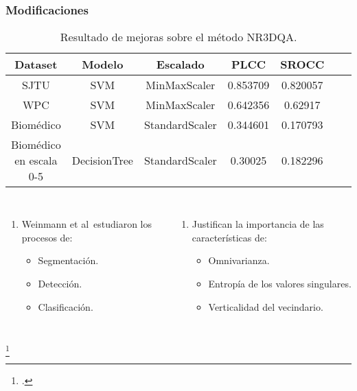 \begin{frame}
  \frametitle{Modificaciones}
  \vspace{-.7cm}
  \begin{table}[htp]
    \small
    \begin{center}
    \caption[Resultado de mejoras sobre el método NR3DQA.]{Resultado de mejoras sobre el método NR3DQA.}
      \begin{tabular}[c]{|c|c|c|c|c|c|c|}
        \hline
        \rowcolor[HTML]{FFC702}
        \textbf{Dataset} & \textbf{Modelo} & \textbf{Escalado} & \textbf{PLCC} & \textbf{SROCC} \\ 
        \hline
        SJTU & SVM & MinMaxScaler & 0.853709 & 0.820057 \\ 
        \hline 
        WPC & SVM & MinMaxScaler & 0.642356 & 0.62917 \\
        \hline 
        Biomédico & SVM & StandardScaler & 0.344601 &  0.170793 \\
        \hline
        Biomédico en escala 0-5 & DecisionTree & StandardScaler & 0.30025  & 0.182296 \\
        \hline
      \end{tabular}
    \end{center}
    \label{tab:ImprovNR3DQA}
  \end{table}
  \begin{columns}
    \begin{enumerate}
      \item Weinmann et al\footnotemark ~estudiaron los procesos de: 
        \begin{itemize}
          \item Segmentación.
          \item Detección.
          \item Clasificación.
        \end{itemize}
    \end{enumerate}
    \begin{enumerate}
      \item Justifican la importancia de las características de:  
        \begin{itemize}
          \item Omnivarianza.
          \item Entropía de los valores singulares.
          \item Verticalidad del vecindario.
        \end{itemize}
    \end{enumerate}
\end{columns}
\footcitetext{3DNSSMetrics}
\end{frame}

